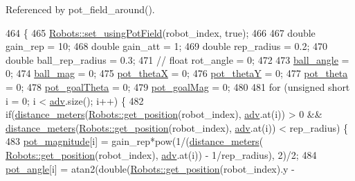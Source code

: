 Referenced by pot\+\_\+field\+\_\+around().


\begin{DoxyCode}
464                                                                      \{
465     \hyperlink{class_robots_a51288c53411bda98c5f9cd05f6ef2a82}{Robots::set\_usingPotField}(robot\_index, \textcolor{keyword}{true});
466 
467     \textcolor{keywordtype}{double} gain\_rep = 10;
468     \textcolor{keywordtype}{double} gain\_att = 1;
469     \textcolor{keywordtype}{double} rep\_radius = 0.2;
470     \textcolor{keywordtype}{double} ball\_rep\_radius = 0.3;
471     \textcolor{comment}{// float rot\_angle = 0;}
472 
473     \hyperlink{class_strategy_a595a6feb9d4a1e3c36185faba232f0d9}{ball\_angle} = 0;
474     \hyperlink{class_strategy_a8c03a4d7a8c88b32d19fe3cd99029c02}{ball\_mag} = 0;
475     \hyperlink{class_strategy_a6963136ba083ba7cf239505b6a587114}{pot\_thetaX} = 0;
476     \hyperlink{class_strategy_a3318f16f937458878a810d28b99bb7a7}{pot\_thetaY} = 0;
477     \hyperlink{class_strategy_a6c8c8a503e17ffce2659af9e33ea86c8}{pot\_theta} = 0;
478     \hyperlink{class_strategy_a457318bd476c9e6debdd872c7d3fe2e7}{pot\_goalTheta} = 0;
479     \hyperlink{class_strategy_a270b91b248a4eb66b356a25e9d1f3f60}{pot\_goalMag} = 0;
480 
481     \textcolor{keywordflow}{for} (\textcolor{keywordtype}{unsigned} \textcolor{keywordtype}{short} i = 0; i < \hyperlink{class_strategy_a4ebbce7f034aaca32adbd4f9607642d9}{adv}.size(); i++) \{
482         \textcolor{keywordflow}{if}(\hyperlink{class_strategy_a4052503aaa94bdbc1fca9f552ef96dbb}{distance\_meters}(\hyperlink{class_robots_a1fca8f2f5070176faa6ba1efa2f1ff14}{Robots::get\_position}(robot\_index), 
      \hyperlink{class_strategy_a4ebbce7f034aaca32adbd4f9607642d9}{adv}.at(i)) > 0 && \hyperlink{class_strategy_a4052503aaa94bdbc1fca9f552ef96dbb}{distance\_meters}(\hyperlink{class_robots_a1fca8f2f5070176faa6ba1efa2f1ff14}{Robots::get\_position}(robot\_index), 
      \hyperlink{class_strategy_a4ebbce7f034aaca32adbd4f9607642d9}{adv}.at(i)) < rep\_radius) \{
483             \hyperlink{class_strategy_afbe79a1885f82b70c71eb30d07fde921}{pot\_magnitude}[i] = gain\_rep*pow(1/(\hyperlink{class_strategy_a4052503aaa94bdbc1fca9f552ef96dbb}{distance\_meters}(
      \hyperlink{class_robots_a1fca8f2f5070176faa6ba1efa2f1ff14}{Robots::get\_position}(robot\_index), \hyperlink{class_strategy_a4ebbce7f034aaca32adbd4f9607642d9}{adv}.at(i)) - 1/rep\_radius), 2)/2;
484             \hyperlink{class_strategy_a8784fcebd4a51853658f9e196e6cd3ea}{pot\_angle}[i] = atan2(\textcolor{keywordtype}{double}(\hyperlink{class_robots_a1fca8f2f5070176faa6ba1efa2f1ff14}{Robots::get\_position}(robot\_index).y - 

\end{DoxyCode}
